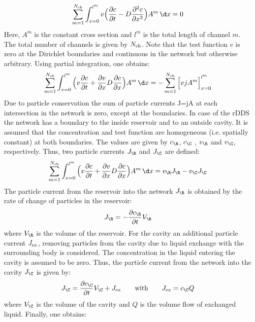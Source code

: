 \begin{align}
  \sum_{m=1}^{N_{\rm ch}} \int_{x=0}^{l^m} v \Big( \frac{\partial c}{\partial t} - D\frac{\partial^2 c}{\partial x^2} \Big) A^m \, \d x = 0
\end{align}
Here, $A^m$ is the constant cross section and $l^m$ is the total length of channel $m$. The total number of channels is given by $N_{\rm ch}$. Note that the test function $v$ is zero at the Dirichlet boundaries and continuous in the network but otherwise arbitrary. Using partial integration, one obtains:
\begin{align}
  \sum_{m=1}^{N_{\rm ch}} \int_{x=0}^{l^m}  \Big( v\frac{\partial c}{\partial t} + \frac{\partial v}{\partial x}D\frac{\partial c}{\partial x} \Big) A^m \, \d x = - \sum_{m=1}^{N_{\rm ch}} \Big[ vjA^m\Big]_{x=0}^{l^m}
\end{align}
Due to particle conservation the sum of particle currents J=jA at each intersection in the network is zero, except at the boundaries. In case of the rDDS the network has a boundary to the inside reservoir and to an outside cavity. It is assumed that the concentration and test function are homogeneous (i.e. spatially constant) at both boundaries. The values are given by $c_{\R}$, $c_\C$ , $v_\R$ and $v_\C$, respectively. Thus, two particle currents $J_\R$ and $J_\C$ are defined:
\begin{align}
  \sum_{m=1}^{N_{\rm ch}} \int_{x=0}^{l^m}  \Big( v\frac{\partial c}{\partial t} + \frac{\partial v}{\partial x}D\frac{\partial c}{\partial x} \Big) A^m \, \d x = v_\R J_\R - v_\C J_\C
\end{align}
The particle current from the reservoir into the network $J_\R$ is obtained by the rate of change of particles in the reservoir:
\begin{align}
  J_\R = -\frac{\partial c_\R}{\partial t} V_\R
\end{align}
where $V_\R$ is the volume of the reservoir. For the cavity an additional particle current $J_{\rm ex}$, removing particles from the cavity due to liquid exchange with the surrounding body is considered. The concentration in the liquid entering the cavity is assumed to be zero. Thus, the particle current from the network into the cavity $J_\C$ is given by:
\begin{align}
  J_\C = \frac{\partial c_\C}{\partial t} V_\C + J_{\rm ex} \qquad \text{with} \qquad J_{\rm ex} = c_\C Q
\end{align}
where $V_\C$ is the volume of the cavity and $Q$ is the volume flow of exchanged liquid. Finally, one obtains:
